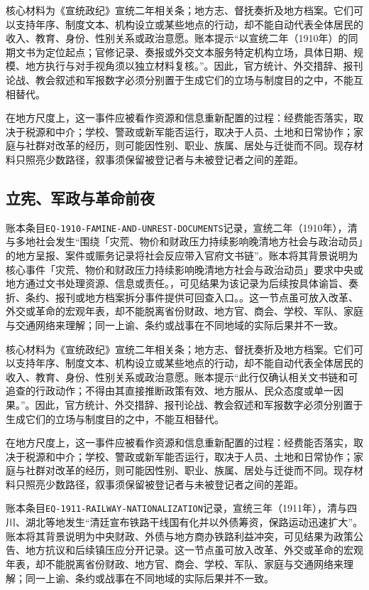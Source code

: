 核心材料为《宣统政纪》宣统二年相关条；地方志、督抚奏折及地方档案。它们可以支持年序、制度文本、机构设立或某些地点的行动，却不能自动代表全体居民的收入、教育、身份、性别关系或政治意愿。账本提示“以宣统二年（1910年）的同期文书为定位起点；官修记录、奏报或外交文本服务特定机构立场，具体日期、规模、地方执行与对手视角须以独立材料复核。”。因此，官方统计、外交措辞、报刊论战、教会叙述和军报数字必须分别置于生成它们的立场与制度目的之中，不能互相替代。

在地方尺度上，这一事件应被看作资源和信息重新配置的过程：经费能否落实，取决于税源和中介；学校、警政或新军能否运行，取决于人员、土地和日常协作；家庭与社群对改革的经历，则可能因性别、职业、族属、居处与迁徙而不同。现存材料只照亮少数路径，叙事须保留被登记者与未被登记者之间的差距。

\subsection{立宪、军政与革命前夜}

账本条目\texttt{EQ-1910-FAMINE-AND-UNREST-DOCUMENTS}记录，宣统二年（1910年），清与多地社会发生“围绕「灾荒、物价和财政压力持续影响晚清地方社会与政治动员」的地方呈报、案件或赈务记录将社会反应带入官府文书链”。账本将其背景说明为核心事件「灾荒、物价和财政压力持续影响晚清地方社会与政治动员」要求中央或地方通过文书处理资源、信息或责任。，可见结果为该记录为后续按具体谕旨、奏折、条约、报刊或地方档案拆分事件提供可回查入口。。这一节点虽可放入改革、外交或革命的宏观年表，却不能脱离省份财政、地方官、商会、学校、军队、家庭与交通网络来理解；同一上谕、条约或战事在不同地域的实际后果并不一致。

核心材料为《宣统政纪》宣统二年相关条；地方志、督抚奏折及地方档案。它们可以支持年序、制度文本、机构设立或某些地点的行动，却不能自动代表全体居民的收入、教育、身份、性别关系或政治意愿。账本提示“此行仅确认相关文书链和可追查的行政动作；不得由其直接推断政策有效、地方服从、民众态度或单一因果。”。因此，官方统计、外交措辞、报刊论战、教会叙述和军报数字必须分别置于生成它们的立场与制度目的之中，不能互相替代。

在地方尺度上，这一事件应被看作资源和信息重新配置的过程：经费能否落实，取决于税源和中介；学校、警政或新军能否运行，取决于人员、土地和日常协作；家庭与社群对改革的经历，则可能因性别、职业、族属、居处与迁徙而不同。现存材料只照亮少数路径，叙事须保留被登记者与未被登记者之间的差距。

账本条目\texttt{EQ-1911-RAILWAY-NATIONALIZATION}记录，宣统三年（1911年），清与四川、湖北等地发生“清廷宣布铁路干线国有化并以外债筹资，保路运动迅速扩大”。账本将其背景说明为中央财政、外债与地方商办铁路利益冲突，可见结果为政策公告、地方抗议和后续镇压应分开记录。这一节点虽可放入改革、外交或革命的宏观年表，却不能脱离省份财政、地方官、商会、学校、军队、家庭与交通网络来理解；同一上谕、条约或战事在不同地域的实际后果并不一致。

